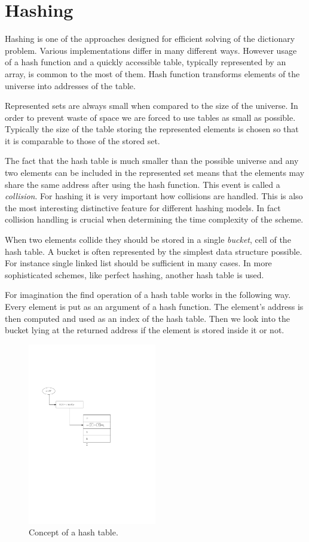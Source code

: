 \chapter{Hashing}
Hashing is one of the approaches designed for efficient solving of the dictionary problem. Various implementations differ in many different ways. However usage of a hash function and a quickly accessible table, typically represented by an array, is common to the most of them. Hash function transforms elements of the universe into addresses of the table.

Represented sets are always small when compared to the size of the universe. In order to prevent waste of space we are forced to use tables as small as possible. Typically the size of the table storing the represented elements is chosen so that it is comparable to those of the stored set. 

The fact that the hash table is much smaller than the possible universe and any two elements can be included in the represented set means that the elements may share the same address after using the hash function. This event is called a \emph{collision}. For hashing it is very important how collisions are handled. This is also the most interesting distinctive feature for different hashing models. In fact collision handling is crucial when determining the time complexity of the scheme.

When two elements collide they should be stored in a single \emph{bucket}, cell of the hash table. A bucket is often represented by the simplest data structure possible. For instance single linked list should be sufficient in many cases. In more sophisticated schemes, like perfect hashing, another hash table is used. 

For imagination the find operation of a hash table works in the following way. Every element is put as an argument of a hash function. The element's address is then computed and used as an index of the hash table. Then we look into the bucket lying at the returned address if the element is stored inside it or not.

\begin{figure}
  \centering
    \includegraphics[width=0.5\textwidth]{images/hash_table}
  \caption{Concept of a hash table.}
\end{figure}

